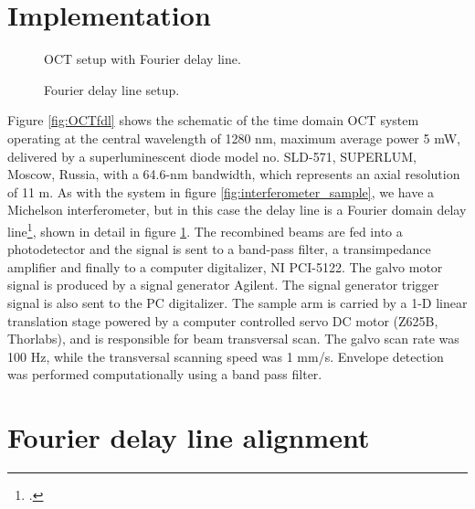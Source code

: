 \documentclass[12pt,twoside,english]{book}
\renewcommand{\~}{\perispomeni}%
\DeclareRobustCommand{\textgreek}[1]{\leavevmode{\greektext #1}}
\numberwithin{equation}{section}
\numberwithin{figure}{section}
\begin{document}
\section{Implementation}

\begin{figure}
\begin{minipage}[t]{0.48\textwidth}

\caption{OCT setup with Fourier delay line.}
\label{fig:OCTfdl}
\end{minipage}
\hfill
\begin{minipage}[t]{0.48\textwidth}

\caption{Fourier delay line setup.}
\label{fig:FDL setup}
\end{minipage}
\end{figure}


Figure \ref{fig:OCTfdl} shows the schematic of the time domain OCT system operating at the central wavelength of 1280 nm, maximum average power 5 mW, delivered by a superluminescent diode model no. SLD-571, SUPERLUM, Moscow, Russia, with a 64.6-nm bandwidth, which represents an axial resolution of 11 \textgreek{m}m. As with the system in figure \ref{fig:interferometer_sample}, we have a Michelson interferometer, but in this case the delay line is a Fourier domain delay line\footcite{Cense:2004p2285}, shown in detail in figure \ref{fig:FDL setup}. The recombined beams are fed into a photodetector and the signal is sent to a band-pass filter, a transimpedance amplifier and finally to a computer digitalizer, NI PCI-5122. The galvo motor signal is produced by a signal generator Agilent. The signal generator trigger signal is also sent to the PC digitalizer. The sample arm is carried by a 1-D linear translation stage powered by a computer controlled servo DC motor (Z625B, Thorlabs), and is responsible for beam transversal scan. The galvo scan rate was 100 Hz, while the transversal scanning speed was 1 mm/s. Envelope detection was performed computationally using a band pass filter.

\section{Fourier delay line alignment}
\end{document}
